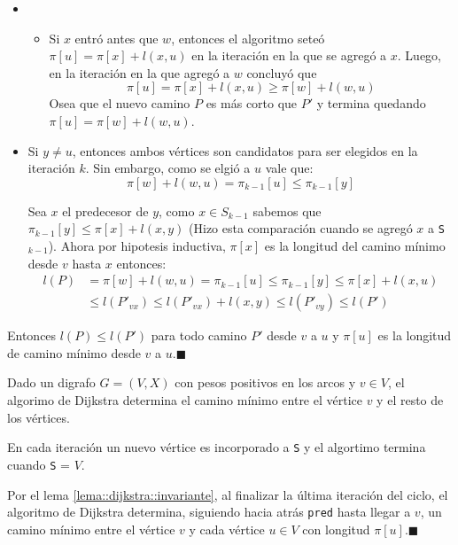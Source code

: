 \begin{demoPart}
  \begin{itemize}
    \item[]
          \begin{itemize}
            Luego, en la iteración  en la que agregó a \(x\) concluyó que \[\pi[u] = \pi[w] + l(w,u) \leq \pi[x] + l(x,u)\]

            Osea que \(P\) es un camino mas corto que \(P'\).
            \item  Si \(x\) entró antes que \(w\), entonces el algoritmo seteó \(\pi[u] = \pi[x] + l(x,u)\) en la iteración en la que se agregó a \(x\). Luego, en la iteración en la que agregó a \(w\) concluyó que \[\pi[u] = \pi[x] + l(x,u) \geq \pi[w] + l(w,u)\]
                  Osea que el nuevo camino \(P\) es más corto que \(P'\) y termina quedando \(\pi[u] = \pi[w] + l(w,u)\).
          \end{itemize}
    \item Si \(y\neq u\), entonces ambos vértices son candidatos para ser elegidos en la iteración \(k\). Sin embargo, como se elgió a \(u\) vale que: \[\pi[w] + l(w,u) = \pi_{k-1}[u] \leq\pi_{k-1}[y]\]

          Sea \(x\) el predecesor de \(y\), como \(x\in S_{k-1}\) sabemos que \(\pi_{k-1}[y]\leq\pi[x] + l(x,y)\) (Hizo esta comparación cuando se agregó \(x\) a \texttt{S}\(_{k-1}\)).
          Ahora por hipotesis inductiva, \(\pi[x]\) es la longitud del camino mínimo desde \(v\) hasta \(x\) entonces:
          \begin{align*}
            l(P) & = \pi[w] + l(w,u) = \pi_{k-1}[u] \leq \pi_{k-1}[y] \leq \pi[x] + l(x,u) \\
                 & \leq l(P'_{vx}) \leq l(P'_{vx}) + l(x,y) \leq l(P'_{vy}) \leq l(P')
          \end{align*}

  \end{itemize}
  Entonces \(l(P)\leq l(P')\) para todo camino \(P'\) desde \(v\) a \(u\) y \(\pi[u]\) es la longitud de camino mínimo desde \(v\) a \(u\).\hfill\(\blacksquare\)
\end{demoPart}

\begin{theorem}
  Dado un digrafo \(G=(V,X)\) con pesos positivos en los arcos y \(v\in V\), el algorimo de Dijkstra determina el camino mínimo entre el vértice \(v\) y el resto de los vértices.
\end{theorem}

\begin{demo}
  En cada iteración un nuevo vértice es incorporado a \texttt{S} y el algortimo termina cuando \texttt{S} = \(V\).

  Por el lema \ref{lema::dijkstra::invariante}, al finalizar la última iteración del ciclo, el algoritmo de Dijkstra determina, siguiendo hacia atrás \texttt{pred} hasta llegar a \(v\), un camino mínimo entre el vértice \(v\) y cada vértice \(u\in V\) con longitud \(\pi[u]\).\hfill\(\blacksquare\)
\end{demo}

